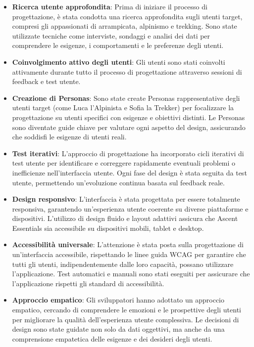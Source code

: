 \begin{itemize}
    \item \textbf{Ricerca utente approfondita}: Prima di iniziare il processo di progettazione, è stata condotta una ricerca approfondita sugli utenti target, compresi gli appassionati di arrampicata, alpinismo e trekking. Sono state utilizzate tecniche come interviste, sondaggi e analisi dei dati per comprendere le esigenze, i comportamenti e le preferenze degli utenti.
    \item \textbf{Coinvolgimento attivo degli utenti}: Gli utenti sono stati coinvolti attivamente durante tutto il processo di progettazione attraverso sessioni di feedback e test utente.
    \item \textbf{Creazione di Personas}: Sono state create Personas rappresentative degli utenti target (come Luca l'Alpinista e Sofia la Trekker) per focalizzare la progettazione su utenti specifici con esigenze e obiettivi distinti. Le Personas sono diventate guide chiave per valutare ogni aspetto del design, assicurando che soddisfi le esigenze di utenti reali.
    \item \textbf{Test iterativi}: L'approccio di progettazione ha incorporato cicli iterativi di test utente per identificare e correggere rapidamente eventuali problemi o inefficienze nell'interfaccia utente. Ogni fase del design è stata seguita da test utente, permettendo un'evoluzione continua basata sul feedback reale.
    \item \textbf{Design responsivo}: L'interfaccia è stata progettata per essere totalmente responsiva, garantendo un'esperienza utente coerente su diverse piattaforme e dispositivi. L'utilizzo di design fluido e layout adattivi assicura che Ascent Essentials sia accessibile su dispositivi mobili, tablet e desktop.
    \item \textbf{Accessibilità universale}: L'attenzione è stata posta sulla progettazione di un'interfaccia accessibile, rispettando le linee guida WCAG per garantire che tutti gli utenti, indipendentemente dalle loro capacità, possano utilizzare l'applicazione. Test automatici e manuali sono stati eseguiti per assicurare che l'applicazione rispetti gli standard di accessibilità.
    \item \textbf{Approccio empatico}: Gli sviluppatori hanno adottato un approccio empatico, cercando di comprendere le emozioni e le prospettive degli utenti per migliorare la qualità dell'esperienza utente complessiva. Le decisioni di design sono state guidate non solo da dati oggettivi, ma anche da una comprensione empatetica delle esigenze e dei desideri degli utenti.
\end{itemize}

